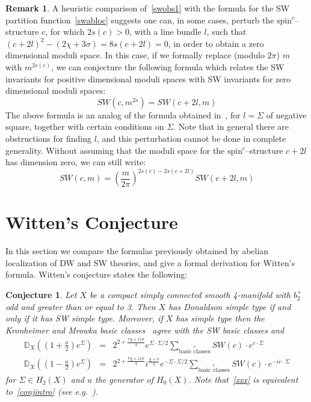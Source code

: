\documentclass[a4paper,12pt,reqno,sumlimits]{amsart}
\theoremstyle{plain}
\newtheorem{conj}[thm]{Conjecture}
\theoremstyle{definition}
\newtheorem{rem}[thm]{Remark}
\newcommand{\D}{{\mathbb D}}
\newcommand{\1}{{\bf 1}}
\newcommand{\spinc}{$\text{spin}^c$}
\numberwithin{equation}{section}
\begin{document}
\begin{rem}
  \label{swrem2}
  A heuristic comparison of~\eqref{swobs1} with the formula for the SW
  partition function~\eqref{swabloc} suggests one can, in some cases,
  perturb the \spinc--structure $c$, for which $2s(c)>0$, with a line bundle
  $l$, such that $(c+2l)^2-(2\chi+3\sigma)=8s(c+2l)=0$, in order to obtain a
  zero dimensional moduli space.  In this case, if we formally replace
  (modulo $2\pi$) $m$ with $m^{2s(c)}$, we can conjecture the following
  formula which relates the SW invariants for positive dimensional moduli
  spaces with SW invariants for zero dimensional moduli spaces:
  $$
  SW(c,m^{2s})= SW(c+2l,m)
  $$
  The above formula is an analog of the formula obtained in~\cite[Theorem
  1.3]{szabo1}, for $l=\Sigma$ of negative square, together with certain
  conditions on $\Sigma$. Note that in general there are obstructions for
  finding $l$, and this perturbation cannot be done in complete generality.
  Without assuming that the moduli space for the \spinc--structure $c+2l$ has
  dimension zero, we can still write:
  \begin{equation}
    \label{swstillcanwrite}
    SW(c,m)=\left(\frac{m}{2\pi}\right)^{2s(c)-2s(c+2l)} SW(c+2l,m)
  \end{equation}
\end{rem}




\section{Witten's Conjecture}
\label{conjecture}

In this section we compare the formulas previously obtained by abelian
localization of DW and SW theories, and give a formal derivation for Witten's
formula.  Witten's conjecture states the following:
\begin{conj}
  Let $X$ be a compact simply connected smooth 4-manifold with $b_2^+$ odd
  and greater than or equal to 3. Then $X$ has Donaldson simple type if and
  only if it has SW simple type. Moreover, if $X$ has simple type then the
  Kronheimer and Mrowka basic classes~\cite{km} agree with the SW basic
  classes and
  \begin{eqnarray}
    \label{xxx}
    \D_X\left(\left(1+\frac{u}{2}\right)e^{\Sigma}\right)&=&
    2^{2+\frac{7\chi+11\sigma}{4}}e^{\Sigma\cdot\Sigma/2}
    \sum_{\stackrel{c}{\text{basic classes}}}SW(c)\cdot e^{c\cdot\Sigma}\nonumber\\
    \D_X\left(\left(1-\frac{u}{2}\right)e^{\Sigma}\right)&=&
    2^{2+\frac{7\chi+11\sigma}{4}}i^{\frac{\chi+\sigma}{4}}e^{-\Sigma\cdot\Sigma/2}
    \sum_{\stackrel{c}{\text{basic classes}}}SW(c)\cdot e^{-ic\cdot\Sigma}
  \end{eqnarray}
  for $\Sigma\in H_2(X)$ and $u$ the generator of $H_0(X)$.  Note
  that~\eqref{xxx} is equivalent to~\eqref{conjintro} (see e.g.~\cite{km}).
\end{conj}
\end{document}
